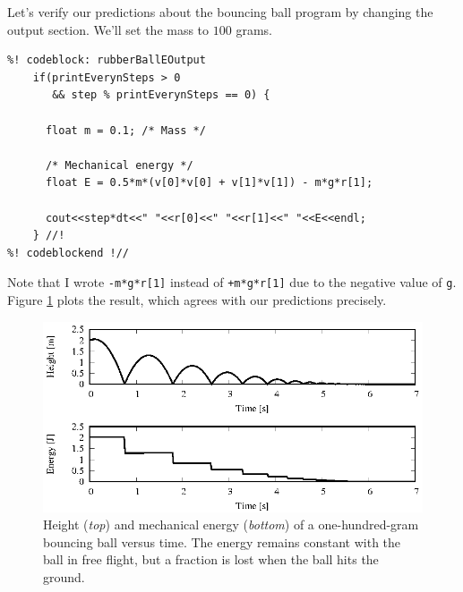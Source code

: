 Let's verify our predictions about the bouncing ball program by changing the 
output section. We'll set the mass to $100$ grams.
\begin{lstlisting}
%! codeblock: rubberBallEOutput
    if(printEverynSteps > 0
       && step % printEverynSteps == 0) {

      float m = 0.1; /* Mass */

      /* Mechanical energy */
      float E = 0.5*m*(v[0]*v[0] + v[1]*v[1]) - m*g*r[1];

      cout<<step*dt<<" "<<r[0]<<" "<<r[1]<<" "<<E<<endl;
    } //!
%! codeblockend !//
\end{lstlisting}
Note that I wrote \texttt{-m*g*r[1]} instead of \texttt{+m*g*r[1]} due to the 
negative value of \texttt{g}. Figure \ref{rubberBallE} plots the result, which 
agrees with our predictions precisely.

\begin{figure}
  \includegraphics[width = \textwidth]{figures/rubberBallE.eps}
  \caption{\label{rubberBallE}Height (\textit{top}) and mechanical energy 
           (\textit{bottom}) of a one-hundred-gram bouncing ball versus time. 
           The energy remains constant with the ball in free flight, but a 
           fraction is lost when the ball hits the ground.}
\end{figure}

